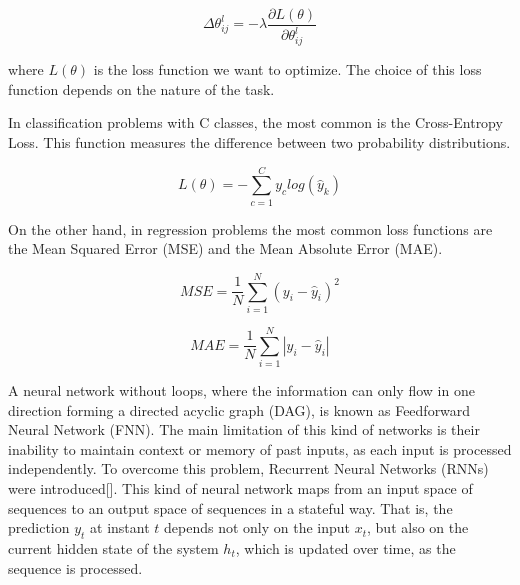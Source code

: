 \documentclass[11pt,english,listoffigures,listoftables]{tfgetsinf}
\begin{document}
\begin{equation}
    \Delta \theta_{ij}^l=-\lambda \frac{\partial L(\theta)}{\partial \theta_{ij}^l}
\end{equation}

where \( L(\theta) \) is the loss function we want to optimize. The choice of this loss function depends on the nature of the task.

In classification problems with C classes, the most common is the Cross-Entropy Loss. This function measures the difference between two probability distributions.

\begin{equation}
    L(\theta) = - \sum_{c=1}^Cy_clog(\hat{y}_k)
\end{equation}

On the other hand, in regression problems the most common loss functions are the Mean Squared Error (MSE) and the Mean Absolute Error (MAE).

\begin{equation}
    MSE = \frac{1}{N} \sum_{i=1}^{N} (y_i - \hat{y}_i)^2
\end{equation}

\begin{equation}
    MAE = \frac{1}{N} \sum_{i=1}^{N} |y_i - \hat{y}_i|
\end{equation}

A neural network without loops, where the information can only flow in one direction forming a directed acyclic graph (DAG), is known as Feedforward Neural Network (FNN). The main limitation of this kind of networks is their inability to maintain context or memory of past inputs, as each input is processed independently. To overcome this problem, Recurrent Neural Networks (RNNs) were introduced[]. This kind of neural network maps from an input space of sequences to an output space of sequences in a stateful way. That is, the prediction \( y_t \) at instant \( t \) depends not only on the input \( x_t \), but also on the current hidden state of the system \( h_t \), which is updated over time, as the sequence is processed. 
\end{document}
